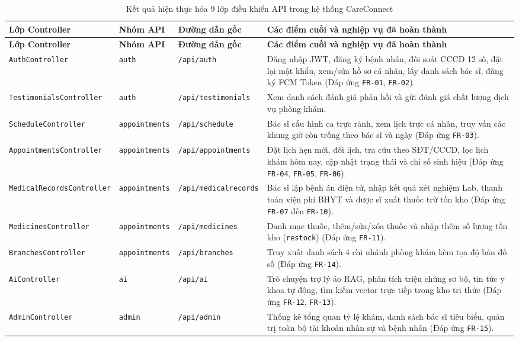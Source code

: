 \begin{longtable}{|p{3.4cm}|p{2.2cm}|p{3.2cm}|p{5.2cm}|}
\caption{Kết quả hiện thực hóa 9 lớp điều khiển API trong hệ thống CareConnect}
\label{tab:api_controllers} \\
\hline
\textbf{Lớp Controller} & \textbf{Nhóm API} & \textbf{Đường dẫn gốc} & \textbf{Các điểm cuối và nghiệp vụ đã hoàn thành} \\
\hline
\endfirsthead
\hline
\textbf{Lớp Controller} & \textbf{Nhóm API} & \textbf{Đường dẫn gốc} & \textbf{Các điểm cuối và nghiệp vụ đã hoàn thành} \\
\hline
\endhead
\texttt{AuthController} & \texttt{auth} & \texttt{/api/auth} & Đăng nhập JWT, đăng ký bệnh nhân, đối soát CCCD 12 số, đặt lại mật khẩu, xem/sửa hồ sơ cá nhân, lấy danh sách bác sĩ, đăng ký FCM Token (Đáp ứng \texttt{FR-01}, \texttt{FR-02}). \\
\hline
\texttt{TestimonialsController} & \texttt{auth} & \texttt{/api/testimonials} & Xem danh sách đánh giá phản hồi và gửi đánh giá chất lượng dịch vụ phòng khám. \\
\hline
\texttt{ScheduleController} & \texttt{appointments} & \texttt{/api/schedule} & Bác sĩ cấu hình ca trực rảnh, xem lịch trực cá nhân, truy vấn các khung giờ còn trống theo bác sĩ và ngày (Đáp ứng \texttt{FR-03}). \\
\hline
\texttt{AppointmentsController} & \texttt{appointments} & \texttt{/api/appointments} & Đặt lịch hẹn mới, đổi lịch, tra cứu theo SĐT/CCCD, lọc lịch khám hôm nay, cập nhật trạng thái và chỉ số sinh hiệu (Đáp ứng \texttt{FR-04}, \texttt{FR-05}, \texttt{FR-06}). \\
\hline
\texttt{MedicalRecordsController} & \texttt{appointments} & \texttt{/api/medicalrecords} & Bác sĩ lập bệnh án điện tử, nhập kết quả xét nghiệm Lab, thanh toán viện phí BHYT và dược sĩ xuất thuốc trừ tồn kho (Đáp ứng \texttt{FR-07} đến \texttt{FR-10}). \\
\hline
\texttt{MedicinesController} & \texttt{appointments} & \texttt{/api/medicines} & Danh mục thuốc, thêm/sửa/xóa thuốc và nhập thêm số lượng tồn kho (\texttt{restock}) (Đáp ứng \texttt{FR-11}). \\
\hline
\texttt{BranchesController} & \texttt{appointments} & \texttt{/api/branches} & Truy xuất danh sách 4 chi nhánh phòng khám kèm tọa độ bản đồ số (Đáp ứng \texttt{FR-14}). \\
\hline
\texttt{AiController} & \texttt{ai} & \texttt{/api/ai} & Trò chuyện trợ lý ảo RAG, phân tích triệu chứng sơ bộ, tin tức y khoa tự động, tìm kiếm vector trực tiếp trong kho tri thức (Đáp ứng \texttt{FR-12}, \texttt{FR-13}). \\
\hline
\texttt{AdminController} & \texttt{admin} & \texttt{/api/admin} & Thống kê tổng quan tỷ lệ khám, danh sách bác sĩ tiêu biểu, quản trị toàn bộ tài khoản nhân sự và bệnh nhân (Đáp ứng \texttt{FR-15}). \\
\hline
\end{longtable}


